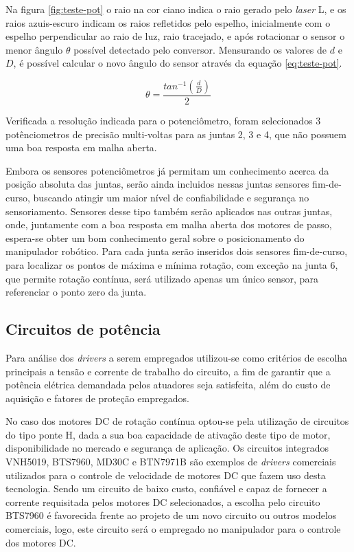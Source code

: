 Na figura \ref{fig:teste-pot} o raio na cor ciano indica o raio gerado pelo \textit{laser} L, e 
os raios azuis-escuro indicam os raios refletidos pelo espelho, inicialmente com o espelho 
perpendicular ao raio de luz, raio tracejado, e após rotacionar o sensor o menor ângulo $\theta$
possível detectado pelo conversor. Mensurando os valores de $d$ e $D$, é possível calcular o 
novo ângulo do sensor através da equação \ref{eq:teste-pot}.

\begin{equation}
    \label{eq:teste-pot}
    \theta = \frac{tan^{-1}\left(\frac{d}{D}\right)}{2}
\end{equation}


Verificada a resolução indicada para o potenciômetro, foram selecionados 3 potênciometros de 
precisão multi-voltas para as juntas 2, 3 e 4, que não possuem uma boa resposta em malha 
aberta.

Embora os sensores potenciômetros já permitam um conhecimento acerca 
da posição absoluta das juntas, serão ainda incluidos nessas juntas 
sensores fim-de-curso, buscando atingir um maior nível de confiabilidade e 
segurança no sensoriamento. 
Sensores desse tipo também serão aplicados nas outras juntas, onde, 
juntamente com a boa resposta em malha aberta dos motores de passo, 
espera-se obter um bom conhecimento geral sobre o posicionamento do 
manipulador robótico. Para cada junta serão inseridos dois sensores fim-de-curso,
para localizar os pontos de máxima e mínima rotação, com exceção na junta 6,
que permite rotação contínua, será utilizado apenas um único sensor, 
para referenciar o ponto zero da junta.

\subsection{Circuitos de potência}
Para análise dos \textit{drivers} a serem empregados utilizou-se como 
critérios de escolha principais a tensão e corrente de trabalho do 
circuito, a fim de garantir que a potência elétrica demandada pelos 
atuadores seja satisfeita, além do custo de aquisição e fatores de proteção 
empregados.


No caso dos motores DC de rotação contínua optou-se pela utilização de 
circuitos do tipo ponte H, dada a sua boa capacidade de ativação deste 
tipo de motor, disponibilidade no mercado e segurança de aplicação. Os 
circuitos integrados VNH5019, BTS7960, MD30C e BTN7971B são exemplos de 
\textit{drivers} comerciais utilizados para o controle de velocidade de 
motores DC que fazem uso desta tecnologia. 
Sendo um circuito de baixo custo, confiável e capaz de 
fornecer a corrente requisitada pelos motores DC selecionados, a escolha 
pelo circuito BTS7960 é favorecida frente ao projeto de um novo circuito 
ou outros modelos comerciais, logo, este circuito será o empregado no 
manipulador para o controle dos motores DC. 

